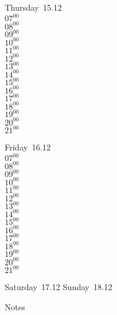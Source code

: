 \documentclass[11pt,a4paper]{book}\usepackage[]{graphicx}\usepackage[]{color}
\begin{document}
\clearpage
\begin{headerbox}
\end{headerbox}
\begin{weekdaybox}
  Thursday~15.12\\
  { 
  \vfill
  $07^{00}$\\
$08^{00}$\\
$09^{00}$\\
$10^{00}$\\
$11^{00}$\\
$12^{00}$\\
$13^{00}$\\
$14^{00}$\\
$15^{00}$\\
$16^{00}$\\
$17^{00}$\\
$18^{00}$\\
$19^{00}$\\
$20^{00}$\\
$21^{00}$\\
  }
\end{weekdaybox} 
\begin{weekdaybox}
  Friday~16.12\\
  { 
  \vfill
  $07^{00}$\\
$08^{00}$\\
$09^{00}$\\
$10^{00}$\\
$11^{00}$\\
$12^{00}$\\
$13^{00}$\\
$14^{00}$\\
$15^{00}$\\
$16^{00}$\\
$17^{00}$\\
$18^{00}$\\
$19^{00}$\\
$20^{00}$\\
$21^{00}$\\
  }
\end{weekdaybox}
\begin{weekendbox}
  Saturday~17.12
  \tcblower
  Sunday~18.12
\end{weekendbox} %
\begin{notebox}
  Notes
\end{notebox}
\clearpage
\end{document}
